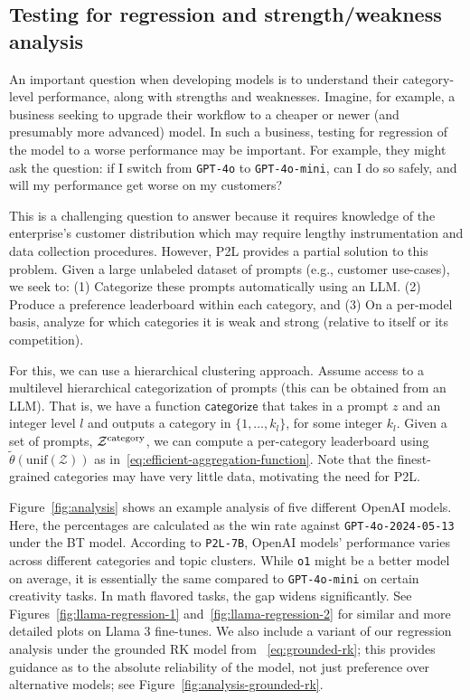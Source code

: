 \subsection{Testing for regression and strength/weakness analysis}
\label{sec:strengths-weaknesses}
An important question when developing models is to understand their category-level performance, along with strengths and weaknesses.
Imagine, for example, a business seeking to upgrade their workflow to a cheaper or newer (and presumably more advanced) model.
In such a business, testing for regression of the model to a worse performance may be important. 
For example, they might ask the question: if I switch from \texttt{GPT-4o} to \texttt{GPT-4o-mini}, can I do so safely, and will my performance get worse on my customers?

This is a challenging question to answer because it requires knowledge of the enterprise's customer distribution which may require lengthy instrumentation and data collection procedures.
However, P2L provides a partial solution to this problem.
Given a large unlabeled dataset of prompts (e.g., customer use-cases), we seek to: (1) Categorize these prompts automatically using an LLM. (2) Produce a preference leaderboard within each category, and (3) On a per-model basis, analyze for which categories it is weak and strong (relative to itself or its competition).

For this, we can use a hierarchical clustering approach. Assume access to a multilevel hierarchical categorization of prompts (this can be obtained from an LLM). 
That is, we have a function $\mathsf{categorize}$ that takes in a prompt $z$ and an integer level $l$ and outputs a category in $\{1, \ldots, k_l\}$, for some integer $k_l$.
Given a set of prompts, $\mathcal{Z}^{\rm category}$, we can compute a per-category leaderboard using $\tilde{\theta}(\mathrm{unif}(\mathcal{Z}))$ as in~\eqref{eq:efficient-aggregation-function}.
Note that the finest-grained categories may have very little data, motivating the need for P2L.

Figure~\ref{fig:analysis} shows an example analysis of five different OpenAI models. Here, the percentages are calculated as the win rate against \texttt{GPT-4o-2024-05-13} under the BT model.
According to \texttt{P2L-7B}, OpenAI models' performance varies across different categories and topic clusters. 
While \texttt{o1} might be a better model on average, it is essentially the same compared to \texttt{GPT-4o-mini} on certain creativity tasks. In math flavored tasks, the gap widens significantly.
See Figures~\ref{fig:llama-regression-1} and~\ref{fig:llama-regression-2} for similar and more detailed plots on Llama 3 fine-tunes.
We also include a variant of our regression analysis under the grounded RK model from ~\eqref{eq:grounded-rk}; this provides guidance as to the absolute reliability of the model, not just preference over alternative models; see Figure~\ref{fig:analysis-grounded-rk}.



